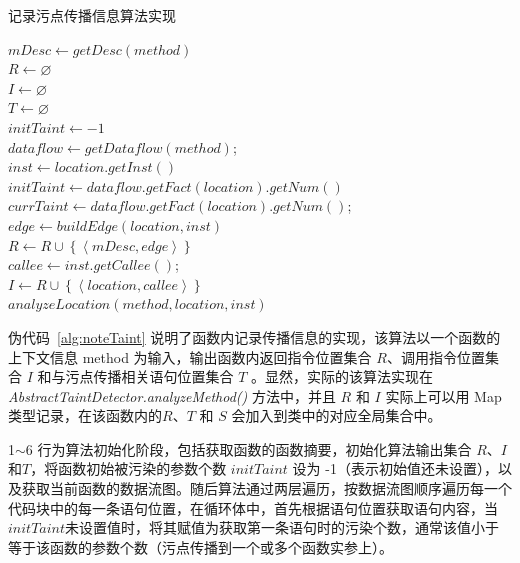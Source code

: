 \begin{algorithm}[!htb]\footnotesize
\caption{记录污点传播信息算法实现}
\label{alg:noteTaint}
$mDesc \leftarrow getDesc(method)$\\
$R \leftarrow \varnothing $\\
$I \leftarrow \varnothing $\\
$T \leftarrow \varnothing $\\
$initTaint \leftarrow -1$\\
$dataflow \leftarrow getDataflow(method)$;\\
 {
     {
        $inst \leftarrow location.getInst()$\\
         {
            $initTaint \leftarrow dataflow.getFact(location).getNum()$\\
        }
         {
            $currTaint \leftarrow dataflow.getFact(location).getNum()$;\\
             {
                $edge \leftarrow buildEdge(location, inst)$\\
                $R \leftarrow R \cup \left\{ \left\langle mDesc, edge \right\rangle \right\}$\\
            }
        }
         {
            $callee \leftarrow inst.getCallee()$;\\
            $I \leftarrow R \cup \left\{ \left\langle location, callee \right\rangle \right\}$\\
            $analyzeLocation(method, location, inst)$\\
        }
    }
}
\end{algorithm}

伪代码~\ref{alg:noteTaint} 说明了函数内记录传播信息的实现，该算法以一个函数的上下文信息 method 为输入，输出函数内返回指令位置集合 $R$、调用指令位置集合 $I$ 和与污点传播相关语句位置集合 $T$ 。显然，实际的该算法实现在 \textit{AbstractTaintDetector.analyzeMethod()} 方法中，并且 $R$ 和 $I$ 实际上可以用 Map 类型记录，在该函数内的$R$、$T$ 和 $S$ 会加入到类中的对应全局集合中。

1$\sim$6 行为算法初始化阶段，包括获取函数的函数摘要，初始化算法输出集合 $R$、$I$和$T$，将函数初始被污染的参数个数 $initTaint$ 设为 -1（表示初始值还未设置），以及获取当前函数的数据流图。随后算法通过两层遍历，按数据流图顺序遍历每一个代码块中的每一条语句位置，在循环体中，首先根据语句位置获取语句内容，当$initTaint$未设置值时，将其赋值为获取第一条语句时的污染个数，通常该值小于等于该函数的参数个数（污点传播到一个或多个函数实参上）。

